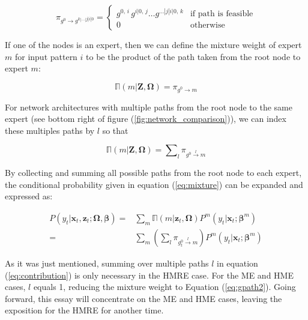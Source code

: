 \documentclass[12pt]{article}
\newcommand{\gateprod}[2]{\pi_{#1 \longrightarrow #2}}
\newcommand{\sumgateprod}[3]{\pi_{#1 \overset{#3}{\longrightarrow} #2}}
\newcommand{\shortsum}[1]{\sum \nolimits_{#1}}
\newcommand{\expmixwt}[0]{\mathbb{\Pi}}
\theoremstyle{definition}
\begin{document}
\begin{equation} \label{eq:gpath}
  \gateprod{g^{0}}{g^{k|\ldots|j|i|0}} =
    \begin{cases} 
       g^{0, \, i} \, g^{i|0, \, j} \ldots g^{\dots|j|i|0, \, k} & \textrm{if path is feasible} \\
       0 & \textrm{otherwise}
    \end{cases}
\end{equation}

If one of the nodes is an expert, then we can define the mixture weight
of expert $m$ for input pattern $i$ to be the product of the path taken
from the root node to expert $m$:

\begin{equation} \label{eq:gpath2}
  \expmixwt(m | \boldsymbol{Z}, \boldsymbol{\Omega}) = \gateprod{g^{0}}{m}
\end{equation}

For network architectures with multiple paths from the root node to
the same expert (see bottom right of figure (\ref{fig:network_comparison})),
we can index these multiples paths by $l$ so that

\begin{equation} \label{eq:pathsums}
  \expmixwt(m | \boldsymbol{Z}, \boldsymbol{\Omega}) = \shortsum{l} \sumgateprod{g^{0}}{m}{l} 
\end{equation}

By collecting and summing all possible paths from the root node to each
expert, the conditional probability given in equation (\ref{eq:mixture}) can be
expanded and expressed as:

\begin{equation} \label{eq:contribution}
  \begin{split}
    P(y_{t}| \boldsymbol{x}_{t}, \boldsymbol{z}_{t}; \boldsymbol{\Omega}, \boldsymbol{\beta}) =& \sum_{m} \expmixwt(m | \boldsymbol{z}_{t}, \boldsymbol{\Omega}) P^{m}(y_{t}| \boldsymbol{x}_{t}; \boldsymbol{\beta}^{m}) \\ 
      =& \sum_{m} \left( \shortsum{l} \sumgateprod{g^{0}_{t}}{m}{l} \right)  P^{m}(y_{t}| \boldsymbol{x}_{t}; \boldsymbol{\beta}^{m})
  \end{split}
\end{equation}

As it was just mentioned, summing over multiple paths $l$ in equation (\ref{eq:contribution})
is only necessary in the HMRE case. For the ME and HME cases, $l$ equals 1,
reducing the mixture weight to Equation (\ref{eq:gpath2}). Going forward,
this essay will concentrate on the ME and HME cases, leaving the
exposition for the HMRE for another time.
\end{document}
